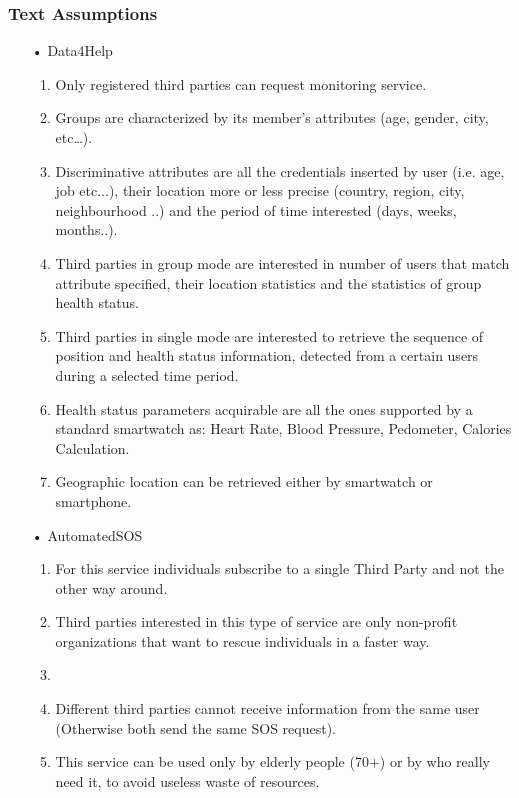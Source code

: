 \subsubsection{Text Assumptions}
\begin{enumerate}

\item[•] {\Large Data4Help}
	\begin{enumerate}
	\item Only registered third parties can request monitoring service.
	\item Groups are characterized by its member’s attributes (age, gender, city, etc…).
	\item Discriminative attributes are all the credentials inserted by user (i.e. age, job etc...), their location more or less precise (country, region, city, neighbourhood ..) and the period of time interested (days, weeks, months..).
	\item Third parties in group mode are interested in number of users that match attribute specified, their location statistics and the statistics of group health status.
	\item Third parties in single mode are interested to retrieve the sequence of position and health status information, detected from a certain users during a selected time period.	
	\item Health status parameters acquirable are all the ones supported by a standard smartwatch as: Heart Rate, Blood Pressure, Pedometer, Calories Calculation.
	\item Geographic location can be retrieved either by smartwatch or smartphone.
	\end{enumerate}
	
\item[•] {\Large AutomatedSOS}
	\begin{enumerate}
	\item For this service individuals subscribe to a single Third Party and not the other way around.
    \item Third parties interested in this type of service are only non-profit organizations that want to rescue individuals in a faster way.
    \item 
    \item Different third parties cannot receive information from the same user (Otherwise both send the same SOS request).
    \item This service can be used only by elderly people (70+) or by who really need it, to avoid useless waste of resources. 
	\end{enumerate}
	

\end{enumerate}
